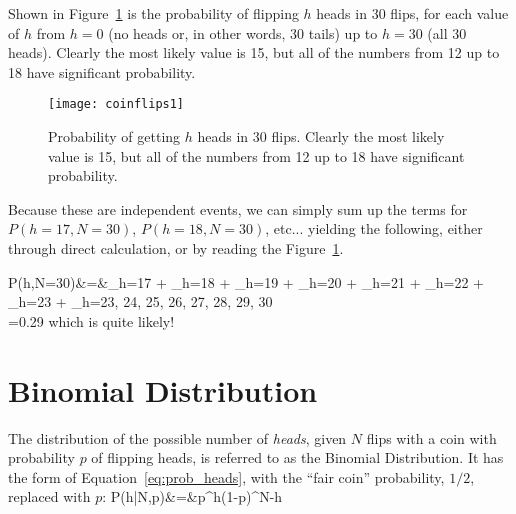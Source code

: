 Shown in Figure~\ref{fig:coinflips1} is the probability of flipping $h$ heads in 30 flips, for each value of $h$ from $h=0$ (no heads or, in other words, 30 tails) up to $h=30$ (all 30 heads). Clearly the most likely value is 15, but all of the numbers from 12 up to 18 have significant probability.

\begin{figure}
\texttt{[image: coinflips1]}
\label{fig:coinflips1}
\caption{Probability of getting $h$ heads in 30 flips.  Clearly the most likely value is 15, but all of the numbers from 12 up to 18 have significant probability.}
\end{figure}


Because these are independent events, we can simply sum up the terms for $P(h=17,N=30)$, $P(h=18,N=30)$, etc... yielding the following, either through direct calculation, or by reading the Figure~\ref{fig:coinflips1}.

\beqn
P(h,N=30)&=&_{h=17} + _{h=18} + _{h=19} + _{h=20} + _{h=21} + _{h=22} + _{h=23} + _{h=23, 24, 25, 26, 27, 28, 29, 30} \\
=0.29
\eeqn
which is quite likely!


\section{Binomial Distribution}

The distribution of the possible number of \emph{heads}, given $N$ flips with a coin with probability $p$ of flipping heads, is referred to as the Binomial Distribution.  It has the form of Equation~\ref{eq:prob_heads}, with the ``fair coin'' probability, $1/2$, replaced with $p$:
\beq
P(h|N,p)&=&\times p^{h}\times (1-p)^{N-h}\label{eq:binomial}
\eeq




